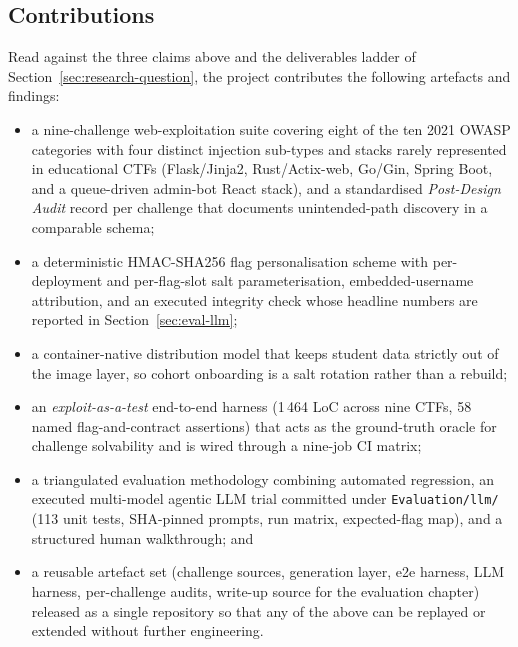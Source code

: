 \subsection{Contributions}
\label{sec:eval-contributions}

Read against the three claims above and the deliverables
ladder of Section~\ref{sec:research-question}, the project
contributes the following artefacts and findings:
\begin{itemize}
    \item a nine-challenge web-exploitation suite covering
          eight of the ten 2021 OWASP categories with four
          distinct injection sub-types and stacks rarely
          represented in educational CTFs (Flask/Jinja2,
          Rust/Actix-web, Go/Gin, Spring Boot, and a
          queue-driven admin-bot React stack), and a
          standardised \textit{Post-Design Audit} record per
          challenge that documents unintended-path discovery
          in a comparable schema;
    \item a deterministic HMAC-SHA256 flag personalisation
          scheme with per-deployment and per-flag-slot salt
          parameterisation, embedded-username attribution,
          and an executed integrity check whose headline
          numbers are reported in Section~\ref{sec:eval-llm};
    \item a container-native distribution model that keeps
          student data strictly out of the image layer, so
          cohort onboarding is a salt rotation rather than a
          rebuild;
    \item an \textit{exploit-as-a-test} end-to-end harness
          (1\,464 LoC across nine CTFs, 58 named flag-and-contract
          assertions) that acts as the ground-truth oracle
          for challenge solvability and is wired through a
          nine-job CI matrix;
    \item a triangulated evaluation methodology combining
          automated regression, an executed multi-model
          agentic LLM trial committed under
          \texttt{Evaluation/llm/} (113 unit tests, SHA-pinned
          prompts, run matrix, expected-flag map), and a
          structured human walkthrough; and
    \item a reusable artefact set (challenge sources,
          generation layer, e2e harness, LLM harness,
          per-challenge audits, write-up source for the
          evaluation chapter) released as a single
          repository so that any of the above can be
          replayed or extended without further engineering.
\end{itemize}
